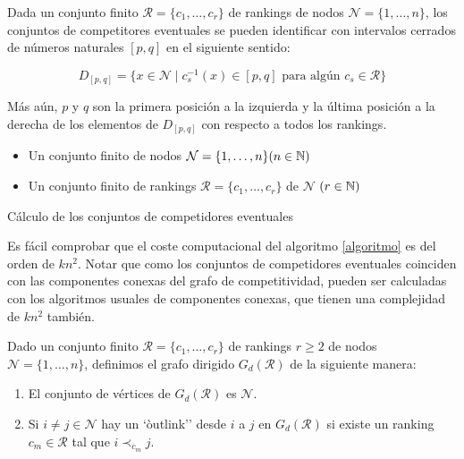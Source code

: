 \begin{teo}
Dada un conjunto finito $\mathcal{R} = \{c_1,\dots,c_r\}$ de rankings de nodos $\mathcal{N} = \{1,\dots, n\}$, los conjuntos de competitores eventuales se pueden identificar con intervalos cerrados de números naturales $[p,q]$ en el siguiente sentido:

\[ D_{[p,q]} = \{ x \in \mathcal{N} \mid c_s^{-1}(x) \in [p,q] \text{ para algún } c_s \in \mathcal{R} \} \]

Más aún, $p$ y $q$ son la primera posición a la izquierda y la última posición a la derecha de los elementos de $D_{[p,q]}$ con respecto a todos los rankings.
\end{teo}

\begin{algorithm}\label{algoritmo}
 \Input{}
 \begin{itemize}
 	\item Un conjunto finito de nodos $\mathcal{N} = \{1,\dots, n\} (n \in \mathbb{N})$
 	\item Un conjunto finito de rankings $\mathcal{R} = \{c_1,\dots,c_r\}$ de $\mathcal{N}$ $(r \in \mathbb{N})$
 \end{itemize}
 
 
 \caption{Cálculo de los conjuntos de competidores eventuales}
\end{algorithm}

Es fácil comprobar que el coste computacional del algoritmo \ref{algoritmo} es del orden de $kn^2$. Notar que como los conjuntos de competidores eventuales coinciden con las componentes conexas del grafo de competitividad, pueden ser calculadas con los algoritmos usuales de componentes conexas, que tienen una complejidad de $kn^2$ también.

\begin{defi}
Dado un conjunto finito $\mathcal{R} = \{c_1,\dots,c_r\}$ de rankings $r\geq 2$ de nodos $\mathcal{N} = \{1,\dots,n\}$, definimos el grafo dirigido $G_d(\mathcal{R})$ de la siguiente manera:
\begin{enumerate}
\item El conjunto de vértices de $G_d(\mathcal{R})$ es $\mathcal{N}$.
\item Si $i \neq j \in \mathcal{N}$ hay un `òutlink'' desde $i$ a $j$ en $G_d(\mathcal{R})$ si existe un ranking $c_m \in \mathcal{R}$ tal que $i\prec_{c_m} j$.
\end{enumerate} 
\end{defi}

